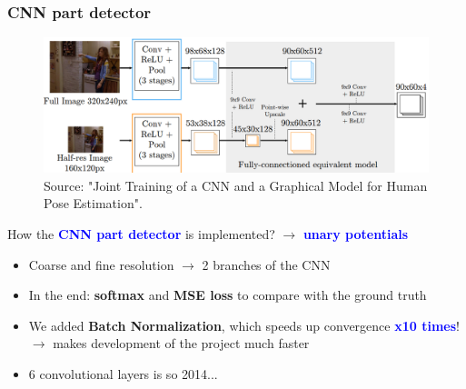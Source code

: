 \documentclass{beamer}
\newcommand\blue[1]{\textcolor{blue}{\textbf{#1}}}
\begin{document}
    
    \begin{frame}[c]
    	\frametitle{CNN part detector}
   		\begin{figure}
   			\includegraphics[scale=0.26]{cnn_architecture.png} \\
   			\scriptsize Source: "Joint Training of a CNN and a Graphical Model for Human Pose Estimation".
   		\end{figure} 
   		
   		How the \blue{CNN part detector} is implemented? $\rightarrow$ \blue{unary potentials} \\
   		\begin{itemize}
   			\item Coarse and fine resolution $\rightarrow$ 2 branches of the CNN
   			\item In the end: \textbf{softmax} and \textbf{MSE loss} to compare with the ground truth
   			\item We added \textbf{Batch Normalization}, which speeds up convergence \blue{x10 times}! $\rightarrow$ makes development of the project much faster
   			\item 6 convolutional layers is so 2014...
   		\end{itemize}
    \end{frame}
\end{document}
